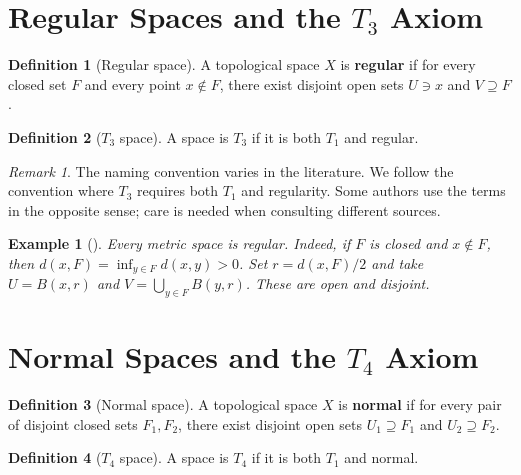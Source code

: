 \documentclass[11pt,a4paper,twoside]{book}
\theoremstyle{remark}
\newtheorem{remark}[theorem]{Remark}
\theoremstyle{definition}
\newtheorem{exampleplain}[theorem]{Example}
\theoremstyle{definition}
\newtheorem{definition}{Definition}[section]
\newenvironment{example}[1][]{%
  \begin{exampleplain}[#1]\itshape
}{%
  \end{exampleplain}
}
\begin{document}
\section{Regular Spaces and the \texorpdfstring{$T_3$}{T3} Axiom}
\label{sec:T3}

\begin{definition}[Regular space]\label{def:regular}
A topological space $X$ is \textbf{regular} if for every closed set $F$ and
every point $x \notin F$, there exist disjoint open sets $U \ni x$ and
$V \supseteq F$.
\end{definition}

\begin{definition}[$T_3$ space]\label{def:T3}
A space is \textbf{$T_3$} if it is both $T_1$ and regular.
\end{definition}

\begin{remark}\label{rem:T3-convention}
The naming convention varies in the literature.  We follow the convention where
$T_3$ requires both $T_1$ and regularity.  Some authors use the terms in the
opposite sense; care is needed when consulting different sources.
\end{remark}

\begin{example}\label{ex:metric-regular}
Every metric space is regular.  Indeed, if $F$ is closed and $x \notin F$,
then $d(x,F) = \inf_{y \in F} d(x,y) > 0$.  Set $r = d(x,F)/2$ and take
$U = B(x,r)$ and $V = \bigcup_{y \in F} B(y,r)$.  These are open and
disjoint.
\end{example}

\section{Normal Spaces and the \texorpdfstring{$T_4$}{T4} Axiom}
\label{sec:T4}

\begin{definition}[Normal space]\label{def:normal}
A topological space $X$ is \textbf{normal} if for every pair of disjoint
closed sets $F_1, F_2$, there exist disjoint open sets $U_1 \supseteq F_1$ and
$U_2 \supseteq F_2$.
\end{definition}

\begin{definition}[$T_4$ space]\label{def:T4}
A space is \textbf{$T_4$} if it is both $T_1$ and normal.
\end{definition}
\end{document}
